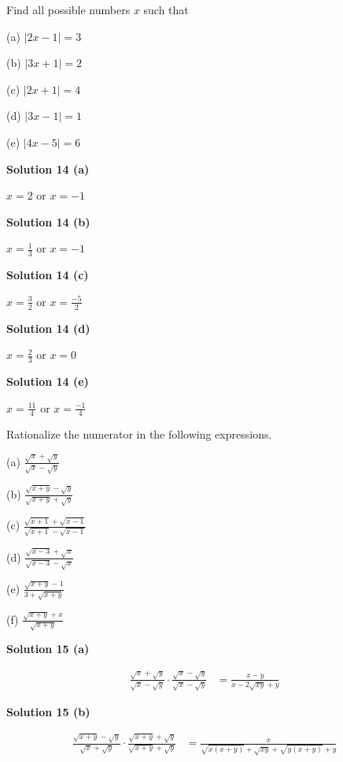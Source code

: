 \documentclass[6pt]{article}
\begin{document}
\begin{tcolorbox}[title=Problem 14, breakable]
    Find all possible numbers $x$ such that 

    (a) $|2x - 1| = 3$

    (b) $|3x + 1| = 2$

    (c) $|2x + 1| = 4$

    (d) $|3x - 1| = 1$

    (e) $|4x - 5| = 6$
\end{tcolorbox}

\textbf{Solution 14 (a)}

$x = 2$ or $x = -1$

\textbf{Solution 14 (b)}

$x = \frac{1}{3}$ or $x = -1$

\textbf{Solution 14 (c)}

$x = \frac{3}{2}$ or $x = \frac{-5}{2}$

\textbf{Solution 14 (d)}

$x = \frac{2}{3}$ or $x = 0$

\textbf{Solution 14 (e)}

$x = \frac{11}{4}$ or $x = \frac{-1}{4}$

\begin{tcolorbox}[title=Problem 15, breakable]
    Rationalize the numerator in the following expressions.

    (a) $\frac{\sqrt{x} + \sqrt{y}}{\sqrt{x} - \sqrt{y}}$

    (b) $\frac{\sqrt{x + y} - \sqrt{y}}{\sqrt{x + y} + \sqrt{y}}$

    (c) $\frac{\sqrt{x + 1} + \sqrt{x - 1}}{\sqrt{x + 1} - \sqrt{x - 1}}$

    (d) $\frac{\sqrt{x - 3} + \sqrt{x}}{\sqrt{x - 3} - \sqrt{x}}$

    (e) $\frac{\sqrt{x + y} - 1}{3 + \sqrt{x + y}}$

    (f) $\frac{\sqrt{x + y} + x}{\sqrt{x + y}}$
\end{tcolorbox}

\textbf{Solution 15 (a)}

\begin{align*}
    \frac{\sqrt{x} + \sqrt{y}}{\sqrt{x} - \sqrt{y}} \cdot \frac{\sqrt{x} - \sqrt{y}}{\sqrt{x} - \sqrt{y}}
        &= \frac{x - y}{x - 2\sqrt{xy} + y}
\end{align*}

\textbf{Solution 15 (b)}

\begin{align*}
    \frac{\sqrt{x + y} - \sqrt{y}}{\sqrt{x} + \sqrt{y}} \cdot \frac{\sqrt{x + y} + \sqrt{y}}{\sqrt{x + y} + \sqrt{y}}
        &= \frac{x}{\sqrt{x(x + y)} + \sqrt{xy} + \sqrt{y(x + y)} + y}
\end{align*}
\end{document}
